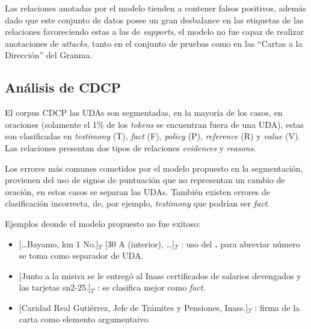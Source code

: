 \documentclass[a4paper,11pt,twocolumn,twoside]{article}
\begin{document}
Las relaciones anotadas por el modelo tienden a contener falsos positivos, además
dado que este conjunto de datos posee un gran desbalance en las etiquetas de las relaciones favoreciendo 
estas a las de \textit{supports}, el modelo no fue capaz de realizar anotaciones de \textit{attacks}, tanto en 
el conjunto de pruebas como en las ``Cartas a la Dirección'' del Granma.

\subsection{Análisis de CDCP}


El corpus CDCP las UDAs son segmentadas, en la mayoría de los casos, en oraciones 
(solamente el 1\% de los \textit{tokens} se encuentran fuera de una UDA),
estas son clasificadas en \textit{testimony} (T), \textit{fact} (F), \textit{policy} (P), \textit{reference} (R)
y \textit{value} (V). Las relaciones presentan dos tipos de relaciones \textit{evidences} y \textit{reasons}.

Los errores más comunes cometidos por el modelo propuesto en la segmentación, provienen del uso 
de signos de puntuación que no representan un cambio de oración, en estos casos se separan las UDAs. También
existen errores de clasificación incorrecta, de, por ejemplo, \textit{testimony} que podrían ser \textit{fact}.

Ejemplos deonde el modelo propuesto no fue exitoso:
\begin{itemize}
	\item \text{} [\dots Bayamo, km 1 No.]$_T$ [30 A (interior), \dots]$_T$
	      : uso del \textbf{.} para abreviar número se toma como separador de UDA. %
	\item \text{} [Junto a la misiva se le entregó al Inass certificados de salarios devengados y las tarjetas sn2-25.]$_T$
	      : se clasifica mejor como \textit{fact}. %
	\item \text{} [Caridad Real Gutiérrez, Jefe de Trámites y Pensiones, Inass.]$_T$
	      : firma de la carta como elemento argumentaivo. %
\end{itemize}
\end{document}
